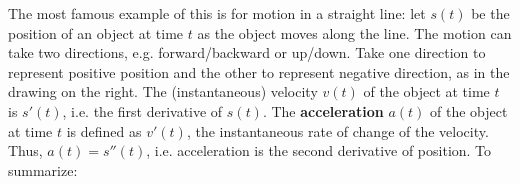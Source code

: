 The most famous example of this is for motion in a straight line: let $s(t)$ be
the position of an object at time $t$ as the object moves along the line. The
motion can take two directions, e.g. forward/backward or up/down. Take one
direction to represent positive position and the other to represent negative
direction, as in the drawing on the right. The (instantaneous) velocity $v(t)$
of the object at time $t$ is $s'(t)$, i.e. the first derivative of $s(t)$. The
\textbf{acceleration} $a(t)$ of the object at time $t$ is
defined as $v'(t)$, the instantaneous rate of change of the velocity. Thus,
$a(t) = s''(t)$, i.e. acceleration is the second derivative of position. To
summarize:


